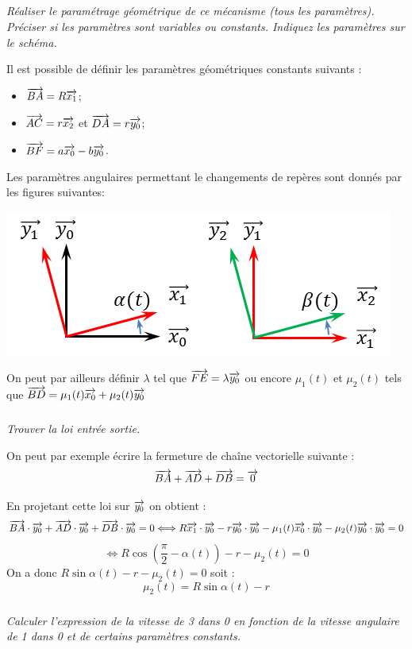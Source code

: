 \documentclass[10pt,fleqn]{article} %
\begin{document}
\begin{multicols}{2}
\subparagraph{}
\textit{Réaliser le paramétrage géométrique de ce mécanisme (tous les paramètres). Préciser si les paramètres sont variables ou constants. Indiquez les paramètres sur le schéma.}

\ifprof
\begin{corrige}
Il est possible de définir les paramètres géométriques constants suivants : 
\begin{itemize}
\item $\overrightarrow{BA} = R\overrightarrow{x_1}$;
\item $\overrightarrow{AC} = r\overrightarrow{x_2}$ et $\overrightarrow{DA} = r\overrightarrow{y_0}$;
\item $\overrightarrow{BF} = a\overrightarrow{x_0}-b\overrightarrow{y_0}$.
\end{itemize}

Les paramètres angulaires permettant le changements de repères sont donnés par les figures suivantes: 
\begin{center}
\includegraphics[width=.6\textwidth]{images/fig1_2c} 
\end{center}

On peut par ailleurs définir $\lambda$ tel que $\overrightarrow{FE} = \lambda \overrightarrow{y_0}$ ou encore $\mu_1(t)$ et $\mu_2(t)$ tels que $\overrightarrow{BD} = \mu_1(t) \overrightarrow{x_0}+\mu_2(t) \overrightarrow{y_0}$
\end{corrige}
\else \fi

\subparagraph{}
\textit{Trouver la loi entrée sortie.}

\ifprof
\begin{corrige}
On peut par exemple écrire la fermeture de chaîne vectorielle suivante :
$$
\overrightarrow{BA}+\overrightarrow{AD}+\overrightarrow{DB}=\overrightarrow{0} 
$$

En projetant cette loi sur $\overrightarrow{y_0}$ on obtient : 
$$
\overrightarrow{BA}\cdot\overrightarrow{y_0}+\overrightarrow{AD}\cdot\overrightarrow{y_0}+\overrightarrow{DB}\cdot\overrightarrow{y_0}=0
\Longleftrightarrow
R\overrightarrow{x_1}\cdot\overrightarrow{y_0} - r\overrightarrow{y_0}\cdot\overrightarrow{y_0}- \mu_1(t) \overrightarrow{x_0}\cdot\overrightarrow{y_0}-\mu_2(t) \overrightarrow{y_0}\cdot\overrightarrow{y_0} = 0
$$
$$
\Longleftrightarrow
R\cos\left( \dfrac{\pi}{2}-\alpha(t)\right) - r-\mu_2(t)=0
$$
On a donc $R\sin\alpha(t) - r-\mu_2(t)=0$ soit :
$$\mu_2(t)=R\sin\alpha(t) - r$$
\end{corrige}
\else \fi


\subparagraph{}
\textit{Calculer l'expression de la vitesse de 3 dans 0 en fonction de la vitesse angulaire de 1 dans 0 et de certains paramètres constants.}


\end{multicols}
\end{document}
